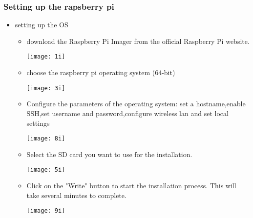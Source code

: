 \subsubsection{Setting up the rapsberry pi}
\begin{itemize}
\item{ setting up the OS }
\begin{itemize}

\item 

\begin{minipage}{0.5\textwidth}
download the Raspberry Pi Imager from the official Raspberry Pi website.
\end{minipage}
\hfill
\begin{minipage}{0.6\textwidth}
\hspace*{0.3in} \texttt{[image: 1i]}
\end{minipage}
\vspace{0.5in}

\item 
\begin{minipage}{0.5\textwidth}
choose the raspberry pi operating system (64-bit)
\end{minipage}
\hfill
\begin{minipage}{0.6\textwidth}
\texttt{[image: 3i]}
\end{minipage}
\vspace{0.5in}
\item 
\begin{minipage}{0.5\textwidth}
Configure the parameters of the operating system: set a hostname,enable SSH,set username and password,configure wireless lan and set local settings
\end{minipage}
\hfill
\begin{minipage}{0.6\textwidth}
\texttt{[image: 8i]}
\end{minipage}
\vspace{0.5in}
\item 
\begin{minipage}{0.5\textwidth}
Select the SD card you want to use for the installation.
\end{minipage}
\hfill
\begin{minipage}{0.6\textwidth}
\texttt{[image: 5i]}
\end{minipage}
\vspace{0.5in}
\item 
\begin{minipage}{0.5\textwidth}
Click on the "Write" button to start the installation process. This will take several minutes to complete.
\end{minipage}
\hfill
\begin{minipage}{0.6\textwidth}
\texttt{[image: 9i]}
\end{minipage}
\end{itemize}



\end{itemize}
